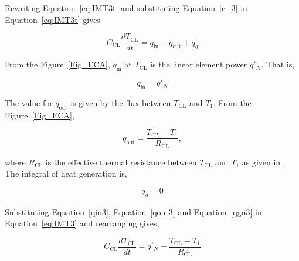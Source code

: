 Rewriting Equation~\ref{eq:IMT3t} and substituting Equation~\ref{c_3} in
Equation~\ref{eq:IMT3t} gives

\begin{equation}
C_{\text{CL}} \frac{dT_{\text{CL}}}{dt} = q_{\mathrm{in}}-q_{\mathrm{out}}+q_g \label{eq:IMT3}
\end{equation}

From the Figure~\ref{Fig_ECA}, $q_{\text{in}}$ at $T_{\text{CL}}$ is the linear
element power $q'_N$. That is,

\begin{equation}
q_{\text{in}}=q'_N \label{qin3}
\end{equation}

The value for $q_{\text{out}}$ is given by the flux between $T_{\text{CL}}$ and $T_1$.
From the Figure~\ref{Fig_ECA},

\begin{equation}
q_{\text{out}}=\frac{T_{CL}-T_1}{R_{\text{CL}}}, \label{qout3}
\end{equation}

where $R_{\text{CL}}$ is the effective thermal resistance between
$T_{\text{CL}}$ and $T_1$ as given in .
\\
The integral of heat generation is,

\begin{equation}
q_{g}=0\label{qgn3}
\end{equation}

Substituting Equation~\ref{qin3}, Equation~\ref{qout3} and Equation~\ref{qgn3}
in Equation~\ref{eq:IMT3}  and rearranging gives,

\begin{equation}
C_{\text{CL}} \frac{dT_{\text{CL}}}{dt} = q'_N-\frac{T_{\text{CL}}-T_1}{R_{\text{CL}}}
\end{equation}

